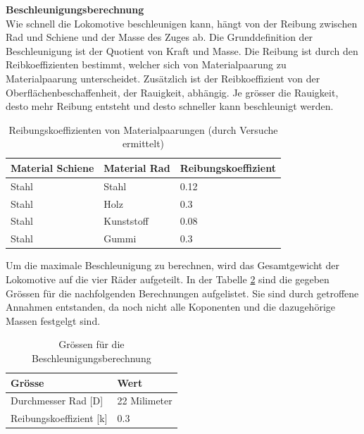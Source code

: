 \documentclass[../../main.tex]{subfiles}
\begin{document}
    \pagebreak

    \textbf{Beschleunigungsberechnung}\\
    Wie schnell die Lokomotive beschleunigen kann, hängt von der Reibung zwischen Rad und Schiene und der Masse des Zuges ab. Die Grunddefinition der Beschleunigung ist der Quotient von Kraft und Masse. Die Reibung ist durch den Reibkoeffizienten bestimmt, welcher sich von Materialpaarung zu Materialpaarung unterscheidet. Zusätzlich ist der Reibkoeffizient von der Oberflächenbeschaffenheit, der Rauigkeit, abhängig. Je grösser die Rauigkeit, desto mehr Reibung entsteht und desto schneller kann beschleunigt werden.

    \begin{table}[H] \centering
        \begin{tabular}{|l|l|l|}
        \hline
        \textbf{Material Schiene} & \textbf{Material Rad} & \textbf{Reibungskoeffizient}\\
        \hline
        Stahl                                & Stahl        & 0.12\\
        \hline
        Stahl                                & Holz         & 0.3\\
        \hline
        Stahl                                & Kunststoff   & 0.08\\
        \hline
        Stahl                                & Gummi        & 0.3\\
        \hline
        \end{tabular}

        \caption{Reibungskoeffizienten von Materialpaarungen (durch Versuche ermittelt)}
        \label{tab:com_tiny_pi}
        \end{table}

    Um die maximale Beschleunigung zu berechnen, wird das Gesamtgewicht der Lokomotive auf die vier Räder aufgeteilt. In der Tabelle \ref{tab:groessen_beschleunigung} sind die gegeben Grössen für die nachfolgenden Berechnungen aufgelistet. Sie sind durch getroffene Annahmen entstanden, da noch nicht alle Koponenten und die dazugehörige Massen festgelgt sind.\\

    \begin{table}[H] \centering
        \begin{tabular}{|l|l|}
        \hline
        \textbf{Grösse} & \textbf{Wert}\\
        \hline
        Durchmesser Rad [D]          & 22 Milimeter\\
         \hline
        Reibungskoeffizient [k]      & 0.3\\
        \hline
        \end{tabular}

        \caption{Grössen für die Beschleunigungsberechnung}
        \label{tab:groessen_beschleunigung}
        \end{table}
\end{document}
